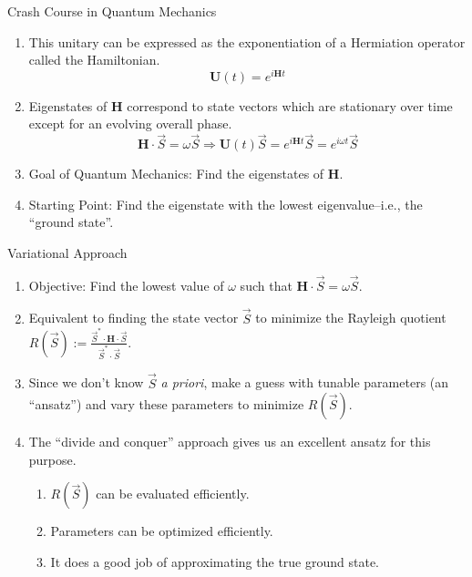 \documentclass{beamer}
\begin{document}
\begin{frame}{Crash Course in Quantum Mechanics}

\begin{enumerate}
\item This unitary can be expressed as the exponentiation of a Hermiation operator called the Hamiltonian.
$$\textbf{U}(t) = e^{i\textbf{H}t}$$
\pause
\item Eigenstates of $\textbf{H}$ correspond to state vectors which are stationary over time except for an evolving overall phase.
$$\textbf{H}\cdot \vec{S} = \omega \vec{S} \Rightarrow \textbf{U}(t)\vec{S} = e^{i\textbf{H}t}\vec{S} = e^{i\omega t}\vec{S}$$
\pause
\item Goal of Quantum Mechanics:  Find the eigenstates of $\textbf{H}$.
\pause
\item Starting Point:  Find the eigenstate with the lowest eigenvalue--i.e., the ``ground state''.
\end{enumerate}

\end{frame}
\begin{frame}{Variational Approach}

\begin{enumerate}
\pause
\item Objective:  Find the lowest value of $\omega$ such that $\textbf{H}\cdot \vec{S} = \omega \vec{S}.$
\pause
\item Equivalent to finding the state vector $\vec{S}$ to minimize the Rayleigh quotient $R(\vec{S}):=\frac{\vec{S}^*\cdot \textbf{H} \cdot \vec{S}}{\vec{S}^*\cdot \vec{S}}.$
\pause
\item Since we don't know $\vec{S}$ \emph{a priori}, make a guess with tunable parameters (an ``ansatz'') and vary these parameters to minimize $R(\vec{S}).$
\pause
\item The ``divide and conquer'' approach gives us an excellent ansatz for this purpose.
\pause
\begin{enumerate}
\item $R(\vec{S})$ can be evaluated efficiently.
\pause
\item Parameters can be optimized efficiently.
\pause
\item It does a good job of approximating the true ground state.
\end{enumerate}
\end{enumerate}

\end{frame}
\end{document}
